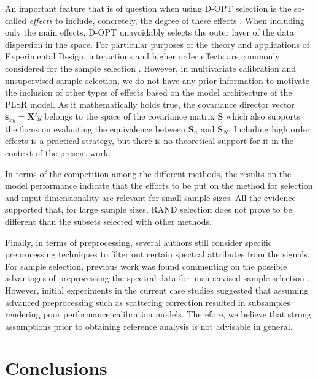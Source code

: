 \documentclass[journal=ancham,manuscript=article]{achemso}
\begin{document}
An important feature that is of question when using D-OPT selection is the so-called \emph{effects} to include, concretely, the degree of these effects \cite{Goos2011}. When including only the main effects, D-OPT unavoidably selects the outer layer of the data dispersion in the space. For particular purposes of the theory and applications of Experimental Design, interactions and higher order effects are commonly considered for the sample selection \cite{Brandmaier2012}. However, in multivariate calibration and unsupervised sample selection, we do not have any prior information to motivate the inclusion of other types of effects based on the model architecture of the PLSR model. As it mathematically holds true, the covariance director vector $\mathbf{s}_{xy} = \mathbf{X}'y$ belongs to the space of the covariance matrix $\mathbf{S}$ which also supports the focus on evaluating the equivalence between $\mathbf{S}_n$ and $\mathbf{S}_N$. Including high order effects is a practical strategy, but there is no theoretical support for it in the context of the present work.

In terms of the competition among the different methods, the results on the model performance indicate that the efforts to be put on the method for selection and input dimensionality are relevant for small sample sizes. All the evidence supported that, for large sample sizes, RAND selection does not prove to be different than the subsets selected with other methods.

Finally, in terms of preprocessing, several authors still consider specific preprocessing techniques to filter out certain spectral attributes from the signals. For sample selection, previous work was found commenting on the possible advantages of preprocessing the spectral data for unsupervised sample selection \cite{Liu2019}. However, initial experiments in the current case studies suggested that assuming advanced preprocessing such as scattering correction resulted in subsamples rendering poor performance calibration models. Therefore, we believe that strong assumptions prior to obtaining reference analysis is not advisable in general.




\section*{Conclusions}\label{conclusions}
\end{document}
